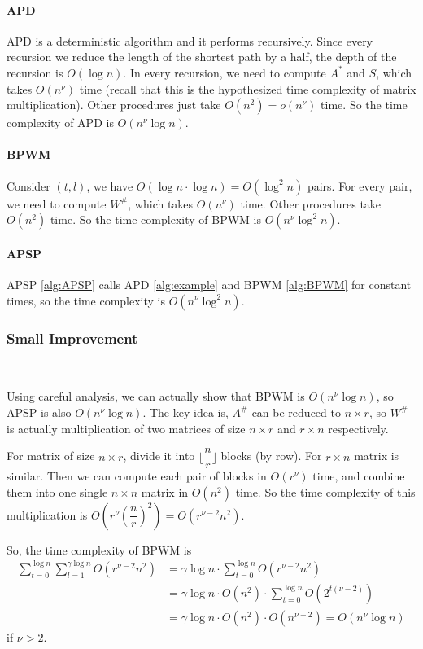 \documentclass[11pt]{article}
\theoremstyle{plain}
\begin{document}
\paragraph{APD} APD is a deterministic algorithm and it performs recursively. Since every recursion we reduce the length of the shortest path by a half, the depth of the recursion is $O(\log n)$. In every recursion, we need to compute $A^*$ and $S$, which takes $O(n^{\nu})$ time (recall that this is the hypothesized time complexity of matrix multiplication). Other procedures just take $O(n^2)=o(n^{\nu})$ time. So the time complexity of APD is $O(n^{\nu}\log n)$.

\paragraph{BPWM} Consider $(t,l)$, we have $O(\log n\cdot \log n)=O(\log^2 n)$ pairs. For every pair, we need to compute $W^{\#}$, which takes $O(n^{\nu})$ time. Other procedures take $O(n^2)$ time. So the time complexity of BPWM is $O(n^{\nu}\log^2 n)$.

\paragraph{APSP} APSP \ref{alg:APSP} calls APD \ref{alg:example} and BPWM \ref{alg:BPWM} for constant times, so the time complexity is $O(n^{\nu}\log^2 n)$.

\subsubsection{Small Improvement}
\label{imp}\

Using careful analysis, we can actually show that BPWM is $O(n^\nu \log n)$, so APSP is also $O(n^\nu \log n)$. The key idea is, $A^\#$ can be reduced to $n\times r$, so $W^\#$ is actually multiplication of two matrices of size $n\times r$ and $r\times n$ respectively.

For matrix of size $n\times r$, divide it into $\lfloor\dfrac{n}{r}\rfloor$ blocks (by row). For $r\times n$ matrix is similar. Then we can compute each pair of blocks in $O(r^{\nu})$ time, and combine them into one single $n\times n$ matrix in $O(n^2)$ time. So the time complexity of this multiplication is $O(r^\nu(\dfrac{n}{r})^2)=O(r^{\nu-2}n^2)$.

So, the time complexity of BPWM is
\begin{align*}
\sum\limits_{t=0}^{\log n}\sum\limits_{l=1}^{\gamma\log n} O(r^{\nu-2}n^2) &= \gamma\log n\cdot \sum\limits_{t=0}^{\log n} O(r^{\nu-2}n^2)\\
&= \gamma\log n\cdot O(n^2)\cdot \sum\limits_{t=0}^{\log n} O(2^{t(\nu-2)})\\
&= \gamma\log n\cdot O(n^2)\cdot O(n^{\nu-2}) = O(n^\nu\log n)
\end{align*}
if $\nu>2$.
\end{document}
